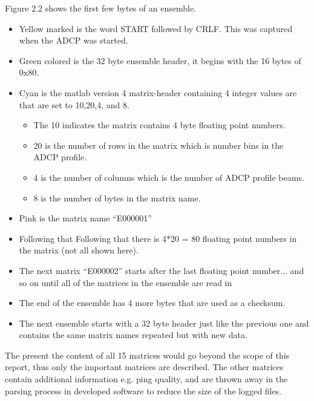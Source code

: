 Figure 2.2 shows the first few bytes of an ensemble.
\begin{itemize}
\item Yellow marked is the word START followed by CRLF. This was captured when the ADCP was started.
\item Green colored is the 32 byte ensemble header, it begins with the 16 bytes of 0x80.
\item  Cyan is the matlab version 4 matrix-header containing 4 integer values are that are set to 10,20,4, and 8.  
\begin{itemize}
\item The 10 indicates the matrix contains 4 byte floating point numbers. 
\item 20 is the number of rows in the matrix which is number bins in the ADCP profile. 
\item 4 is the number of columns which is the number of ADCP profile beams.  
\item 8 is the number of bytes in the matrix name.  
\end{itemize}
\item Pink is the matrix name ``E000001''
\item Following that Following that there is 4*20 = 80 floating point numbers in the matrix (not all shown here).
\item The next matrix ``E000002'' starts after the last floating point number... and so on until all of the matrices in the ensemble are read in
\item The end of the ensemble has 4 more bytes that are used as a checksum. 
\item The next ensemble starts with a 32 byte header just like the previous one and contains the same matrix names repeated but with new data. 
\end{itemize}

The present the content of all 15 matrices would go beyond the scope of this report, thus only the important matrices are described. The other matrices contain additional information e.g. ping quality, and are thrown away in the parsing process in developed software to reduce the size of the logged files.\\

